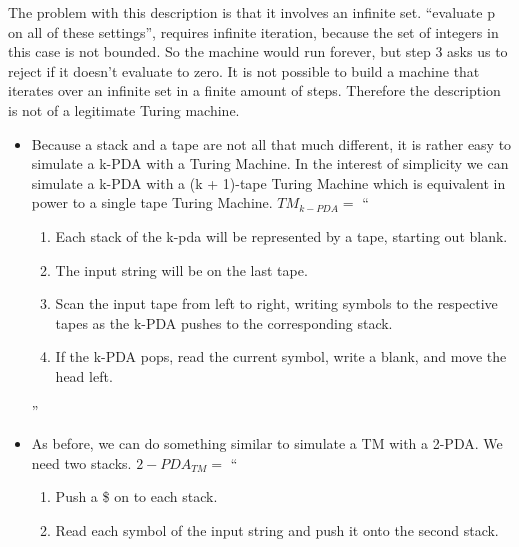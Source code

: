 \begin{problem}{4}
  \begin{solution}
    The problem with this description is that it involves an infinite set. ``evaluate p on all of these settings'',
    requires infinite iteration, because the set of integers in this case is not bounded. So the machine would run
    forever, but step 3 asks us to reject if it doesn't evaluate to zero. It is not possible to build a machine that
    iterates over an infinite set in a finite amount of steps.  Therefore the description is not of a legitimate Turing
    machine.
  \end{solution}
\end{problem}

\begin{problem}{5}
  \begin{solution}
    \begin{itemize}
      \item Because a stack and a tape are not all that much different, it is rather easy to simulate a k-PDA with a
      Turing Machine.  In the interest of simplicity we can simulate a k-PDA with a (k + 1)-tape Turing Machine which is
      equivalent in power to a single tape Turing Machine.
      $TM_{k-PDA} = $ ``
      \begin{enumerate}
        \item Each stack of the k-pda will be represented by a tape, starting out blank. \\
        \item The input string will be on the last tape. \\
        \item Scan the input tape from left to right, writing symbols to the respective tapes as the k-PDA pushes to the corresponding stack. \\
        \item If the k-PDA pops, read the current symbol, write a blank, and move the head left.
      \end{enumerate}
      '' \\
      \item As before, we can do something similar to simulate a TM with a 2-PDA. We need two stacks.
      $2-PDA_{TM} =$ ``
        \begin{enumerate}
          \item Push a \$ on to each stack. \\
          \item Read each symbol of the input string and push it onto the second stack. \\

\end{enumerate}
\end{itemize}
\end{solution}
\end{problem}
